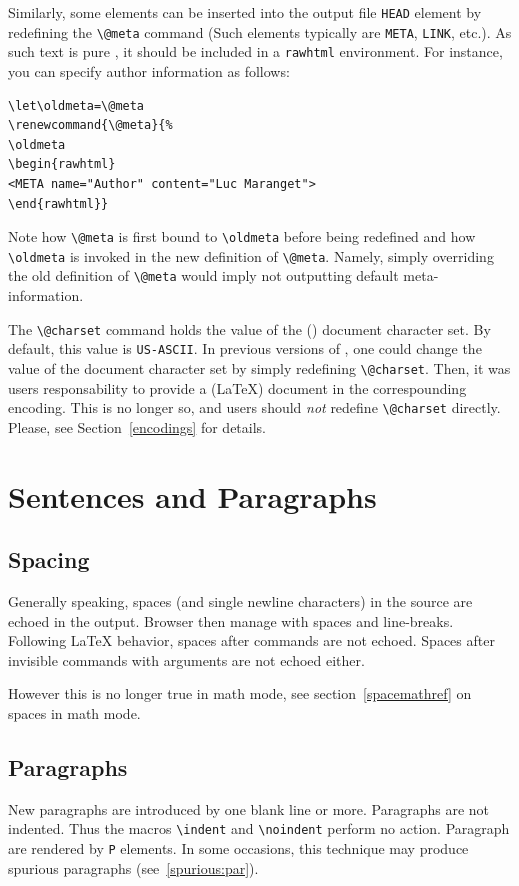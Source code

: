 \label{exlet}Similarly, some elements can be inserted into the output file
\verb+HEAD+ element by redefining the \verb+\@meta+ command
(Such elements typically are \verb+META+, \verb+LINK+, etc.).
As such text is pure \html{}, it should be included in a
\verb+rawhtml+ environment. For instance, you can specify
author information as follows:
\begin{verbatim}
\let\oldmeta=\@meta
\renewcommand{\@meta}{%
\oldmeta
\begin{rawhtml}
<META name="Author" content="Luc Maranget">
\end{rawhtml}}
\end{verbatim}
Note how \verb+\@meta+ is first bound to
\verb+\oldmeta+ before being redefined and how \verb+\oldmeta+ is
invoked in the new definition of \verb+\@meta+.
Namely, simply overriding the old definition of \verb+\@meta+ would
imply not outputting default meta-information.

The \verb+\@charset+ command holds the value of the (\html) document character
set. By default, this value is \texttt{US-ASCII}.
In previous versions of \hevea{}, one could change the
value of the document character set by simply redefining
\verb+\@charset+. Then, it was users responsability to provide a
(\LaTeX) document in the correspounding encoding.
This is no longer so, and users should \emph{not} redefine
\verb+\@charset+ directly. Please, see Section~\ref{encodings} for details.


\section{Sentences and Paragraphs}

\subsection{Spacing}
Generally speaking, spaces (and single newline characters) in the
source are echoed in the output.  Browser then manage with spaces and
line-breaks.  Following \LaTeX{} behavior, spaces after commands are
not echoed.  Spaces after invisible commands with arguments are not
echoed either.

However this is no longer true in math mode, see
section~\ref{spacemathref} on spaces in math mode.

\subsection{Paragraphs}
New paragraphs are introduced by one blank line or more.
Paragraphs are not indented. Thus the macros \verb+\indent+ and
\verb+\noindent+ perform no action.
Paragraph are rendered by \verb+P+ elements.
In some occasions, this technique may produce spurious paragraphs
(see~\ref{spurious:par}).

